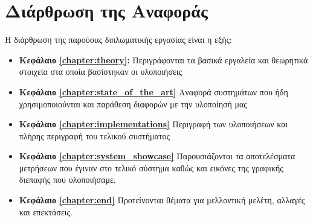 \section{Διάρθρωση της Αναφοράς}
\label{section:layout}

Η διάρθρωση της παρούσας διπλωματικής εργασίας είναι η εξής:

\begin{itemize}
  \item{\textbf{Κεφάλαιο \ref{chapter:theory}:} 
		Περιγράφονται τα βασικά εργαλεία και θεωρητικά στοιχεία
		στα οποία βασίστηκαν οι υλοποιήσεις
    }
  \item{\textbf{Κεφάλαιο \ref{chapter:state_of_the_art}} Αναφορά συστημάτων που ήδη χρησιμοποιούνται	
		και παράθεση διαφορών με την υλοποίησή μας
    }
  \item{\textbf{Κεφάλαιο \ref{chapter:implementations}} Περιγραφή των υλοποιήσεων
  		και πλήρης περιγραφή του τελικού συστήματος
    }
  \item{\textbf{Κεφάλαιο \ref{chapter:system_showcase}} Παρουσιάζονται τα αποτελέσματα μετρήσεων
    που έγιναν στο τελικό σύστημα καθώς και εικόνες της γραφικής διεπαφής που υλοποιήσαμε.
    }
  \item{\textbf{Κεφάλαιο \ref{chapter:end}} Προτείνονται θέματα για μελλοντική
      μελέτη, αλλαγές και επεκτάσεις.
    }
\end{itemize}
